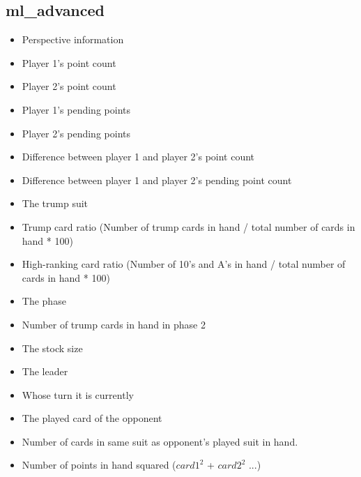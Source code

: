 \documentclass[a4paper,11pt]{article}
\begin{document}
\begin{description}
\subsection{ml\_advanced}
\begin{itemize}
\item Perspective information
\item Player 1's point count
\item Player 2's point count
\item Player 1's pending points
\item Player 2's pending points
\item Difference between player 1 and player 2's point count
\item Difference between player 1 and player 2's pending point count
\item The trump suit
\item Trump card ratio (Number of trump cards in hand / total number of cards in hand * 100)
\item High-ranking card ratio (Number of 10's and A's in hand / total number of cards in hand * 100)
\item The phase
\item Number of trump cards in hand in phase 2
\item The stock size
\item The leader
\item Whose turn it is currently
\item The played card of the opponent
\item Number of cards in same suit as opponent's played suit in hand.
\item Number of points in hand squared ($card1^2$ + $card2^2$ ...)
\end{itemize}


\end{description}
\end{document}
